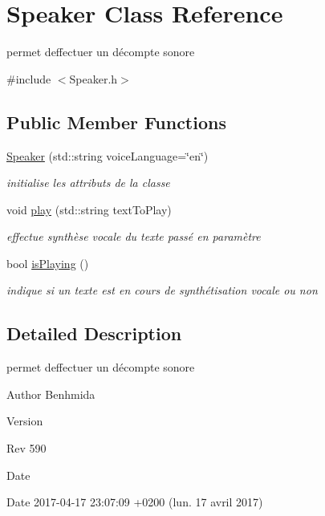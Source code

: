 \hypertarget{class_speaker}{}\section{Speaker Class Reference}
\label{class_speaker}


permet d\textquotesingle{}effectuer un décompte sonore  




{\ttfamily \#include $<$Speaker.\+h$>$}

\subsection*{Public Member Functions}
\begin{DoxyCompactItemize}
\item 
\hyperlink{class_speaker_ad3ab39863028f1f841895b9399fd6941}{Speaker} (std\+::string voice\+Language=\char`\"{}en\char`\"{})
\begin{DoxyCompactList}\small\item\em initialise les attributs de la classe \end{DoxyCompactList}\item 
void \hyperlink{class_speaker_ae59e5a67cc26d08a94a1eb0a759620c0}{play} (std\+::string text\+To\+Play)
\begin{DoxyCompactList}\small\item\em effectue synthèse vocale du texte passé en paramètre \end{DoxyCompactList}\item 
bool \hyperlink{class_speaker_a81aeeedaeecbb85d0fb103906e24991a}{is\+Playing} ()
\begin{DoxyCompactList}\small\item\em indique si un texte est en cours de synthétisation vocale ou non \end{DoxyCompactList}\end{DoxyCompactItemize}


\subsection{Detailed Description}
permet d\textquotesingle{}effectuer un décompte sonore 

\begin{DoxyAuthor}{Author}
Benhmida 
\end{DoxyAuthor}
\begin{DoxyVersion}{Version}

\end{DoxyVersion}
\begin{DoxyParagraph}{Rev}
590 
\end{DoxyParagraph}
\begin{DoxyDate}{Date}

\end{DoxyDate}
\begin{DoxyParagraph}{Date}
2017-\/04-\/17 23\+:07\+:09 +0200 (lun. 17 avril 2017) 
\end{DoxyParagraph}


